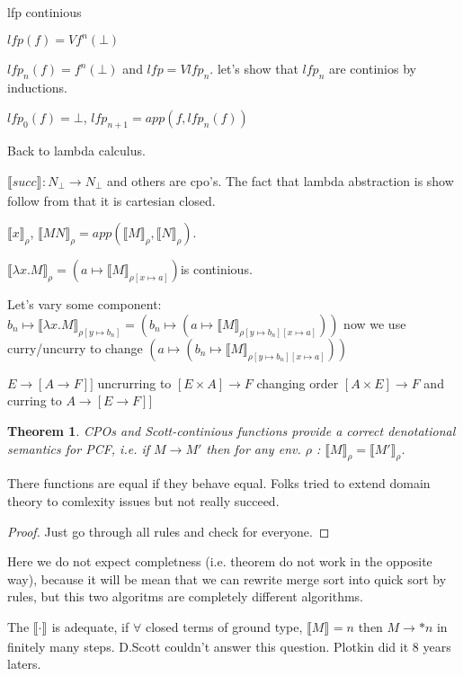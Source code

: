 \documentclass[a4paper,10pt]{book}
\newtheorem{theorem}{Theorem}
\newcommand{\sem}[2]{ \llbracket#1\rrbracket_{#2} }
\newcommand{\rarr}{ \rightarrow }
\begin{document}
 lfp continious
 
 $lfp(f) = V f^n(\bot)$
 
 $lfp_n(f) = f^n(\bot)$ and $lfp = Vlfp_n$. let's show that $lfp_n$ are continios by inductions.
 
 $lfp_0(f) = \bot$, $lfp_{n+1} = app(f, lfp_n(f))$
 
 
 Back to lambda calculus.
 
 $\sem{succ}{} : N_\bot \rarr N_\bot $ and others are cpo's. The fact that lambda abstraction is
 show follow from that it is cartesian closed.
 
 $\sem{x}{\rho}$, $\sem{MN}{\rho} = app(\sem{M}{\rho}, \sem{N}{\rho})$.
 
 $\sem{\lambda x.M}{\rho} = (a \mapsto \sem{M}{\rho[x \mapsto a]}) $is continious.
 
 Let's vary some component: $b_n \mapsto \sem{\lambda x.M}{\rho[y\mapsto b_n]} = 
 (b_n \mapsto (a \mapsto \sem{M}{\rho[y\mapsto b_n][x \mapsto a]})) $ now we use curry/uncurry to change 
 $(a \mapsto (b_n \mapsto \sem{M}{\rho[y\mapsto b_n][x \mapsto a]}))$
 
 $E\rarr[A\rarr F]]$ uncrurring to $[E\times A]\rarr F$ changing order $[A\times E]\rarr F$ and 
 curring  to $A\rarr[E\rarr F]]$
 
\begin{theorem}
 CPOs and Scott-continious functions provide a correct denotational semantics for PCF,
 i.e. if $M\rarr M'$ then for any env. $\rho$ : $\sem{M}{\rho} = \sem{M'}{\rho}$.
\end{theorem}
There functions are equal if they behave equal. Folks tried to extend domain theory to 
comlexity issues but not really succeed.

\begin{proof}
 Just go through all rules and check for everyone.
\end{proof}

Here we do not expect completness (i.e. theorem do not work in the opposite way), because it will 
be mean that we can rewrite merge sort into quick sort by rules, but this two algoritms are completely
different algorithms.

The $\sem{\cdot}{}$ is adequate, if $\forall$ closed terms of ground type, $\sem{M}{}=n$ then
$M \rarr* n$ in finitely many steps. D.Scott couldn't answer this question. Plotkin did it 8 years 
laters.
\end{document}
